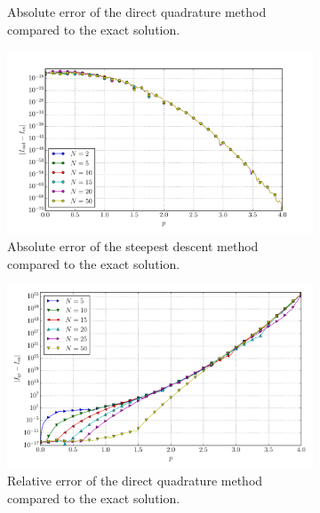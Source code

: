 \documentclass[a4paper,10pt]{article}
\begin{document}
\begin{figure}[ht!]
\begin{subfigure}[t]{0.5\linewidth}
    \caption{Absolute error of the direct quadrature method compared to the exact solution.}
    \label{fig:tp_1d_conv_p_2_1_err_qr}
  \end{subfigure}
  \begin{subfigure}[t]{0.5\linewidth}
    \includegraphics[width=\linewidth]{./plots/tp_1d_conv_p_2_1_err_nsd.pdf}
    \caption{Absolute error of the steepest descent method compared to the exact solution.}
    \label{fig:tp_1d_conv_p_2_1_err_nsd}
  \end{subfigure}
  \begin{subfigure}[t]{0.5\linewidth}
    \includegraphics[width=\linewidth]{./plots/tp_1d_conv_p_2_1_err_rel_qr.pdf}
    \caption{Relative error of the direct quadrature method compared to the exact solution.}
    \label{fig:tp_1d_conv_p_2_1_err_rel_qr}
  \end{subfigure}
  \begin{subfigure}[t]{0.5\linewidth}

\end{subfigure}
\end{figure}
\end{document}
